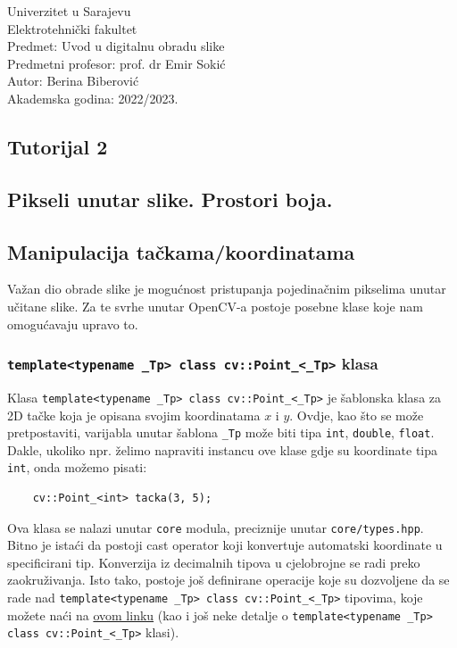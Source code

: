 \documentclass[a4paper, 12pt]{article}
\begin{document}
\noindent
Univerzitet u Sarajevu\\
Elektrotehnički fakultet\\
Predmet: Uvod u digitalnu obradu slike\\
Predmetni profesor: prof. dr Emir Sokić\\
Autor: Berina Biberović\\
Akademska godina: 2022/2023.


\begin{center}
    \section*{Tutorijal 2}
    \subsection*{Pikseli unutar slike. Prostori boja.}
\end{center}


\subsection*{Manipulacija tačkama/koordinatama}

Važan dio obrade slike je mogućnost pristupanja pojedinačnim pikselima unutar učitane slike. Za te svrhe unutar OpenCV-a postoje posebne klase koje nam omogućavaju upravo to.

\subsubsection*{\lstinline{template<typename _Tp> class cv::Point_<_Tp>} klasa}

Klasa \lstinline{template<typename _Tp> class cv::Point_<_Tp>} je šablonska klasa za 2D tačke koja je opisana svojim koordinatama $x$ i $y$. Ovdje, kao što se može pretpostaviti, varijabla unutar šablona \lstinline{_Tp} može biti tipa \lstinline{int}, \lstinline{double}, \lstinline{float}. Dakle, ukoliko npr. želimo napraviti instancu ove klase gdje su koordinate tipa \lstinline{int}, onda možemo pisati:

\begin{lstlisting}
    cv::Point_<int> tacka(3, 5);
\end{lstlisting}

Ova klasa se nalazi unutar \lstinline{core} modula, preciznije unutar \lstinline{core/types.hpp}. Bitno je istaći da postoji cast operator koji konvertuje automatski koordinate u specificirani tip. Konverzija iz decimalnih tipova u cjelobrojne se radi preko zaokruživanja. Isto tako, postoje još definirane operacije koje su dozvoljene da se rade nad \lstinline{template<typename _Tp> class cv::Point_<_Tp>} tipovima, koje možete naći na \href{https://docs.opencv.org/3.4/db/d4e/classcv_1_1Point__.html}{ovom linku} (kao i još neke detalje o \lstinline{template<typename _Tp> class cv::Point_<_Tp>} klasi).
\end{document}
